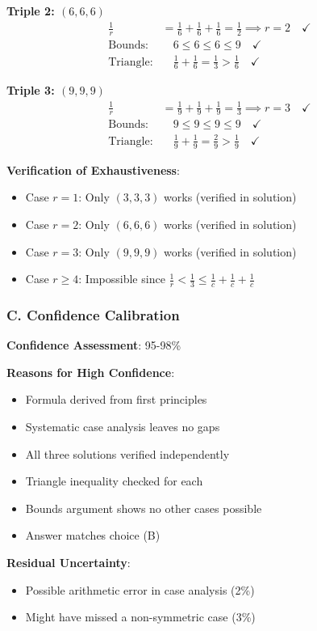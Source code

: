 \documentclass[12pt]{article}
\begin{document}
\begin{verificationbox}
\textbf{Triple 2: $(6, 6, 6)$}
\begin{align*}
\frac{1}{r} &= \frac{1}{6} + \frac{1}{6} + \frac{1}{6} = \frac{1}{2} \implies r = 2 \quad \checkmark \\
\text{Bounds:} &\quad 6 \leq 6 \leq 6 \leq 9 \quad \checkmark \\
\text{Triangle:} &\quad \frac{1}{6} + \frac{1}{6} = \frac{1}{3} > \frac{1}{6} \quad \checkmark
\end{align*}

\textbf{Triple 3: $(9, 9, 9)$}
\begin{align*}
\frac{1}{r} &= \frac{1}{9} + \frac{1}{9} + \frac{1}{9} = \frac{1}{3} \implies r = 3 \quad \checkmark \\
\text{Bounds:} &\quad 9 \leq 9 \leq 9 \leq 9 \quad \checkmark \\
\text{Triangle:} &\quad \frac{1}{9} + \frac{1}{9} = \frac{2}{9} > \frac{1}{9} \quad \checkmark
\end{align*}

\textbf{Verification of Exhaustiveness}:
\begin{itemize}
    \item Case $r = 1$: Only $(3, 3, 3)$ works (verified in solution)
    \item Case $r = 2$: Only $(6, 6, 6)$ works (verified in solution)
    \item Case $r = 3$: Only $(9, 9, 9)$ works (verified in solution)
    \item Case $r \geq 4$: Impossible since $\frac{1}{r} < \frac{1}{3} \leq \frac{1}{c} + \frac{1}{c} + \frac{1}{c}$
\end{itemize}

\subsubsection*{C. Confidence Calibration}

\textbf{Confidence Assessment}: 95-98\%

\textbf{Reasons for High Confidence}:
\begin{itemize}
    \item Formula derived from first principles
    \item Systematic case analysis leaves no gaps
    \item All three solutions verified independently
    \item Triangle inequality checked for each
    \item Bounds argument shows no other cases possible
    \item Answer matches choice (B)
\end{itemize}

\textbf{Residual Uncertainty}:
\begin{itemize}
    \item Possible arithmetic error in case analysis (2\%)
    \item Might have missed a non-symmetric case (3\%)
\end{itemize}

\end{verificationbox}
\end{document}
